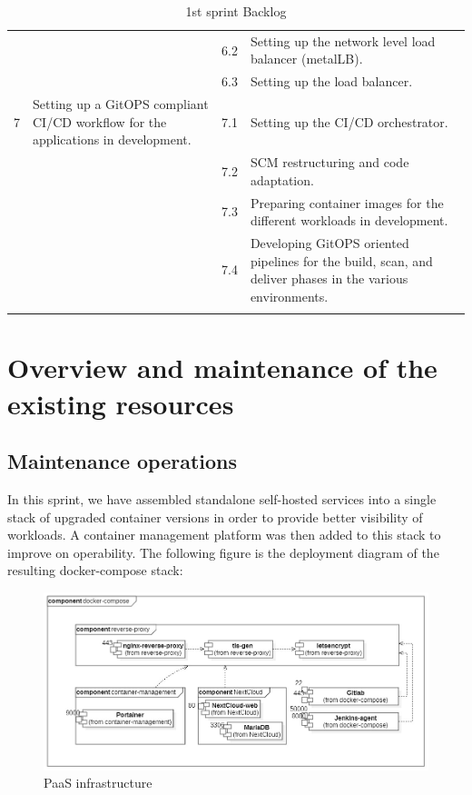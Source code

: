 \begin{longtable}[ht]{|m{1.5cm}|m{3cm}|m{1.5cm}|m{8cm}|}
\cline{3-4}
& & 6.2 & Setting up the network level load balancer (metalLB). \\
\cline{3-4}
& & 6.3	& Setting up the load balancer. \\
\cline{3-4}
\hline
7  & Setting up a GitOPS compliant CI/CD workflow for the applications in development.  &  7.1	 & Setting up the CI/CD orchestrator.\\
\cline{3-4}
& & 7.2 & SCM restructuring and code adaptation. \\
\cline{3-4}
& & 7.3	& Preparing container images for the different workloads in development.  \\
\cline{3-4}
& & 7.4	& Developing GitOPS oriented pipelines for the build, scan, and deliver phases in the various environments.  \\
\cline{3-4}
\hline
\caption{1st sprint Backlog}
\end{longtable}
\newpage
\section{Overview and maintenance of the existing resources}
\subsection{Maintenance operations}

In this sprint, we have assembled standalone self-hosted services into a single stack of upgraded container versions in order to provide better visibility of workloads. A container management platform was then added to this stack to improve on operability. 
The following figure is the deployment diagram of the resulting docker-compose stack:

 \begin{figure}[H] 
\includegraphics[width=1.0\textwidth,angle=00]{assets/f9.jpg}
\caption{PaaS infrastructure}
\label{fig:f9}
\end{figure}

